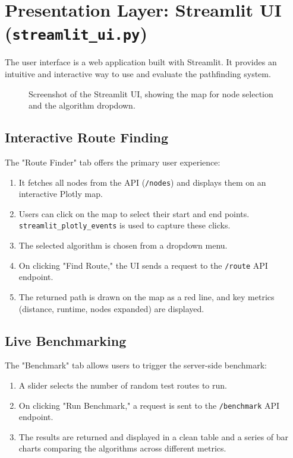 \documentclass[12pt, a4paper]{report}
\begin{document}
\section{Presentation Layer: Streamlit UI (\texttt{streamlit\_ui.py})}

The user interface is a web application built with Streamlit. It provides an intuitive and interactive way to use and evaluate the pathfinding system.

\begin{figure}[h!]
    \centering
    \fbox{\rule{0pt}{3in}\rule{0.9\linewidth}{0pt}}
    \caption{Screenshot of the Streamlit UI, showing the map for node selection and the algorithm dropdown.}
    \label{fig:ui}
\end{figure}

\subsection{Interactive Route Finding}
The "Route Finder" tab offers the primary user experience:
\begin{enumerate}
    \item It fetches all nodes from the API (\texttt{/nodes}) and displays them on an interactive Plotly map.
    \item Users can click on the map to select their start and end points. \texttt{streamlit\_plotly\_events} is used to capture these clicks.
    \item The selected algorithm is chosen from a dropdown menu.
    \item On clicking "Find Route," the UI sends a request to the \texttt{/route} API endpoint.
    \item The returned path is drawn on the map as a red line, and key metrics (distance, runtime, nodes expanded) are displayed.
\end{enumerate}

\subsection{Live Benchmarking}
The "Benchmark" tab allows users to trigger the server-side benchmark:
\begin{enumerate}
    \item A slider selects the number of random test routes to run.
    \item On clicking "Run Benchmark," a request is sent to the \texttt{/benchmark} API endpoint.
    \item The results are returned and displayed in a clean table and a series of bar charts comparing the algorithms across different metrics.
\end{enumerate}
\end{document}
